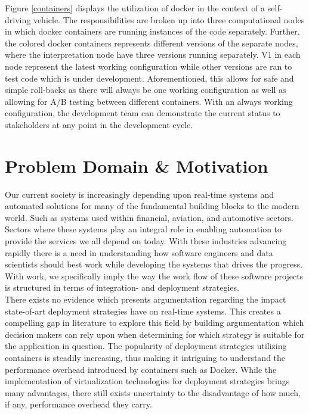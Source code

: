 Figure \ref{containers} displays the utilization of docker in the context of a self-driving vehicle. The responsibilities are broken up into three computational nodes in which docker containers are running instances of the code separately. Further, the colored docker containers represents different versions of the separate nodes, where the interpretation node have three versions running separately. V1 in each node represent the latest working configuration while other versions are ran to test code which is under development. Aforementioned, this allows for safe and simple roll-backs as there will always be one working configuration as well as allowing for A/B testing between different containers. With an always working configuration, the development team can demonstrate the current status to stakeholders at any point in the development cycle. \\




\section{Problem Domain \& Motivation}
Our current society is increasingly depending upon real-time systems and automated solutions for many of the fundamental building blocks to the modern world. Such as systems used within financial, aviation, and automotive sectors. Sectors where these systems play an integral role in enabling automation to provide the services we all depend on today. With these industries advancing rapidly there is a need in understanding how software engineers and data scientists should best work while developing the systems that drives the progress. With work, we specifically imply the way the work flow of these software projects is structured in terms of integration- and deployment strategies.\\

There exists no evidence which presents argumentation regarding the impact state-of-art deployment strategies have on real-time systems. This creates a compelling gap in literature to explore this field by building argumentation which decision makers can rely upon when determining for which strategy is suitable for the application in question. The popularity of deployment strategies utilizing containers is steadily increasing, thus making it intriguing to understand the performance overhead introduced by containers such as Docker. While the implementation of virtualization technologies for deployment strategies brings many advantages, there still exists uncertainty to the disadvantage of how much, if any, performance overhead they carry.\\


